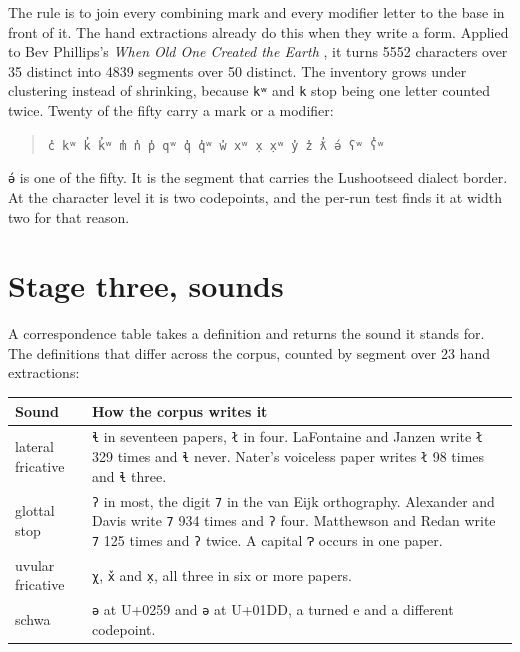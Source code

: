 The rule is to join every combining mark and every modifier letter to the base in front of it. The
hand extractions already do this when they write a form. Applied to Bev Phillips's
\emph{When Old One Created the Earth} \cite{src:Hall-and-Phillips-2025}, it turns 5552 characters over 35 distinct into 4839 segments
over 50 distinct. The inventory grows under clustering instead of shrinking, because \texttt{kʷ} and
\texttt{k} stop being one letter counted twice. Twenty of the fifty carry a mark or a modifier:

\begin{quote}
\texttt{c̓ kʷ k̓ k̓ʷ m̓ n̓ p̓ qʷ q̓ q̓ʷ w̓ xʷ x̣ x̣ʷ y̓ z̓ ƛ̓ ə́ ʕʷ ʕ̓ʷ}
\end{quote}

\texttt{ə́} is one of the fifty. It is the segment that carries the Lushootseed dialect border. At
the character level it is two codepoints, and the per-run test finds it at width two for that
reason.

\section{Stage three, sounds}

A correspondence table takes a definition and returns the sound it stands for. The definitions that
differ across the corpus, counted by segment over 23 hand extractions:

\tiny
\setlength{\tabcolsep}{2pt}
\begin{longtable}{@{}>{\arraybackslash}p{}>{\arraybackslash}p{}@{}}
\toprule
Sound & How the corpus writes it \\
\midrule
lateral fricative & \texttt{ɬ} in seventeen papers, \texttt{ł} in four. LaFontaine and Janzen \cite{src:LaFontaine-and-Janzen-2024} write \texttt{ł} 329 times and \texttt{ɬ} never. Nater's voiceless paper writes \texttt{ł} 98 times and \texttt{ɬ} three. \\
glottal stop & \texttt{ʔ} in most, the digit \texttt{7} in the van Eijk orthography. Alexander and Davis \cite{src:Alexander-and-Davis-2026} write \texttt{7} 934 times and \texttt{ʔ} four. Matthewson and Redan \cite{src:Matthewson-and-Redan-2026} write \texttt{7} 125 times and \texttt{ʔ} twice. A capital \texttt{Ɂ} occurs in one paper. \\
uvular fricative & \texttt{χ}, \texttt{x̌} and \texttt{x̣}, all three in six or more papers. \\
schwa & \texttt{ə} at U+0259 and \texttt{ǝ} at U+01DD, a turned e and a different codepoint. \\
\bottomrule
\end{longtable}
\normalsize

